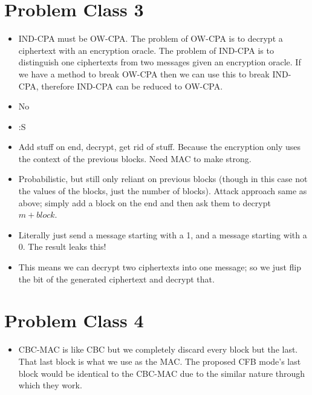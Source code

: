 \section{Problem Class 3}
	\begin{itemize}
		\item IND-CPA must be OW-CPA. The problem of OW-CPA is to decrypt a ciphertext with an encryption oracle. The problem of IND-CPA is to distinguish one ciphertexts from two messages given an encryption oracle. If we have a method to break OW-CPA then we can use this to break IND-CPA, therefore IND-CPA can be reduced to OW-CPA.
		\item No
		\item :S
		\item Add stuff on end, decrypt, get rid of stuff. Because the encryption only uses the context of the previous blocks. Need MAC to make strong.
		\item Probabilistic, but still only reliant on previous blocks (though in this case not the values of the blocks, just the number of blocks). Attack approach same as above; simply add a block on the end and then ask them to decrypt $m+block$.
		\item Literally just send a message starting with a 1, and a message starting with a 0. The result leaks this!
		\item This means we can decrypt two ciphertexts into one message; so we just flip the bit of the generated ciphertext and decrypt that.
	\end{itemize}

\section{Problem Class 4}
	\begin{itemize}
		\item CBC-MAC is like CBC but we completely discard every block but the last. That last block is what we use as the MAC. The proposed CFB mode's last block would be identical to the CBC-MAC due to the similar nature through which they work.


	\end{itemize}